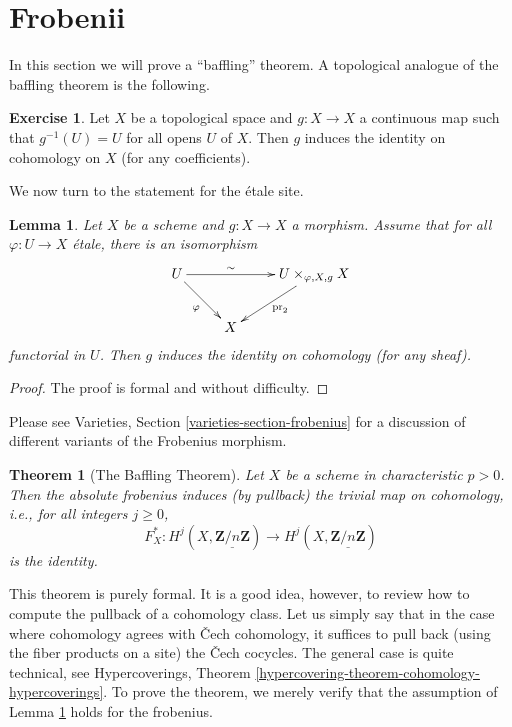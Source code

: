 \documentclass{stacks-project}
\theoremstyle{plain}
\newtheorem{theorem}[subsection]{Theorem}
\newtheorem{lemma}[subsection]{Lemma}
\theoremstyle{definition}
\newtheorem{exercise}[subsection]{Exercise}
\theoremstyle{remark}
\numberwithin{equation}{subsection}
\begin{document}
\section{Frobenii}
\label{section-frobenii}

\noindent
In this section we will prove a ``baffling'' theorem.
A topological analogue of the baffling theorem is the following.

\begin{exercise}
\label{exercise-baffling}
Let $X$ be a topological space and $g : X \to X$ a continuous map such that
$g^{-1}(U) = U$ for all opens $U$ of $X$. Then $g$ induces the identity on
cohomology on $X$ (for any coefficients).
\end{exercise}

\noindent
We now turn to the statement for the \'etale site.

\begin{lemma}
\label{lemma-baffling}
Let $X$ be a scheme and $g : X \to X$ a morphism. Assume that for all
$\varphi : U \to X$ \'etale, there is an isomorphism
$$
\xymatrix{
U \ar[rd]_\varphi \ar[rr]^-\sim & & {U
\times_{\varphi, X, g} X} \ar[ld]^{\text{pr}_2} \\
& X
}
$$
functorial in $U$. Then $g$ induces the identity on cohomology (for any sheaf).
\end{lemma}

\begin{proof}
The proof is formal and without difficulty.
\end{proof}

\noindent
Please see Varieties, Section \ref{varieties-section-frobenius}
for a discussion of different variants of the Frobenius morphism.

\begin{theorem}[The Baffling Theorem]
\label{theorem-baffling}
Let $X$ be a scheme in characteristic $p > 0$. Then the absolute frobenius
induces (by pullback) the trivial map on cohomology, i.e., for all
integers $j\geq 0$,
$$
F_X^* : H^j (X, \underline{\mathbf{Z}/n\mathbf{Z}}) \longrightarrow H^j (X,
\underline{\mathbf{Z}/n\mathbf{Z}})
$$
is the identity.
\end{theorem}

\noindent
This theorem is purely formal. It is a good idea, however, to review how to
compute the pullback of a cohomology class. Let us simply say that in the case
where cohomology agrees with {\v C}ech cohomology, it suffices to pull back
(using the fiber products on a site) the {\v C}ech cocycles. The general case is
quite technical, see
Hypercoverings, Theorem \ref{hypercovering-theorem-cohomology-hypercoverings}.
To prove the theorem, we merely
verify that the assumption of Lemma \ref{lemma-baffling}
holds for the frobenius.
\end{document}
